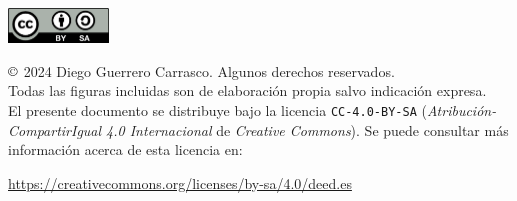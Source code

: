 \vspace*{\fill}

\begin{center}
    \includegraphics[width=0.2\textwidth]{imagenes/utilizadas/0-inicio/cc-40-by-sa}
\end{center}

\noindent $\copyright$ 2024 Diego Guerrero Carrasco. Algunos derechos reservados.\\
\noindent Todas las figuras incluidas son de elaboración propia salvo indicación expresa.\\
\noindent El presente documento se distribuye bajo la licencia \texttt{CC-4.0-BY-SA} (\textit{Atribución-CompartirIgual 4.0 Internacional} de \textit{Creative Commons}). Se puede consultar más información acerca de esta licencia en:
\begin{center}
    \href{https://creativecommons.org/licenses/by-sa/4.0/deed.es}{https://creativecommons.org/licenses/by-sa/4.0/deed.es}
\end{center}
